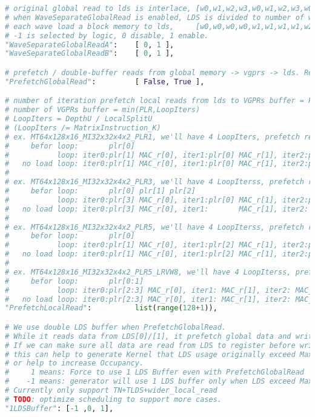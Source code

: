 \documentclass[]{article}
\begin{document}
\begin{lstlisting}[language=python,breaklines=true]
# original global read to lds is interlace, [w0,w1,w2,w3,w0,w1,w2,w3,w0,w1,w2,w3,w0,w1,w2,w3]
# when WaveSeparateGlobalRead is enabled, LDS is divided to number of waves part.
# each wave load a block memory to lds,     [w0,w0,w0,w0,w1,w1,w1,w1,w2,w2,w2,w2,w3,w3,w3,w3]
# -1 is selected by logic, 0 disable, 1 enable.
"WaveSeparateGlobalReadA":    [ 0, 1 ],
"WaveSeparateGlobalReadB":    [ 0, 1 ],

# prefetch / double-buffer reads from global memory -> vgprs -> lds. Requires 2X LDS space, and VGPRs for buffering data on way into LDS
"PrefetchGlobalRead":         [ False, True ],

# number of iteration prefetch local reads from lds to VGPRs buffer = PLR % LoopIter
# number of VGPRs buffer = min(PLR,LoopIters)
# LoopIters = DepthU / LocalSplitU
# (LoopIters /= MatrixInstruction_K)
# ex. MT64x128x16_MI32x32x4x2_PLR1, we'll have 4 LoopIters, prefetch read 1 iteration, with 2 VGPRs buffer
#     befor loop:       plr[0]
#           loop: iter0:plr[1] MAC_r[0], iter1:plr[0] MAC_r[1], iter2:plr[1] MAC_r[0], iter3:plr[0] MAC_r[1]
#   no load loop: iter0:plr[1] MAC_r[0], iter1:plr[0] MAC_r[1], iter2:plr[1] MAC_r[0], iter3:       MAC_r[1]
#
# ex. MT64x128x16_MI32x32x4x2_PLR3, we'll have 4 LoopIterss, prefetch read 3 iteration, with 4 VGPRs buffer
#     befor loop:       plr[0] plr[1] plr[2]
#           loop: iter0:plr[3] MAC_r[0], iter1:plr[0] MAC_r[1], iter2:plr[1] MAC_r[2], iter3:plr[2] MAC_r[3]
#   no load loop: iter0:plr[3] MAC_r[0], iter1:       MAC_r[1], iter2:       MAC_r[2], iter3:       MAC_r[3]
#
# ex. MT64x128x16_MI32x32x4x2_PLR5, we'll have 4 LoopIterss, prefetch read 5%4=1 iteration, with 4 VGPRs buffer
#     befor loop:       plr[0]
#           loop: iter0:plr[1] MAC_r[0], iter1:plr[2] MAC_r[1], iter2:plr[3] MAC_r[2], iter3:plr[0] MAC_r[3]
#   no load loop: iter0:plr[1] MAC_r[0], iter1:plr[2] MAC_r[1], iter2:plr[3] MAC_r[2], iter3:       MAC_r[3]
#
# ex. MT64x128x16_MI32x32x4x2_PLR5_LRVW8, we'll have 4 LoopIterss, prefetch read 5%4=1 iteration, with 4 VGPRs buffer, each read read 2 iterations
#     befor loop:       plr[0:1]
#           loop: iter0:plr[2:3] MAC_r[0], iter1: MAC_r[1], iter2: MAC_r[2], iter3:plr[0:1] MAC_r[3]
#   no load loop: iter0:plr[2:3] MAC_r[0], iter1: MAC_r[1], iter2: MAC_r[2], iter3:         MAC_r[3]
"PrefetchLocalRead":          list(range(128+1)),

# We use double LDS buffer when PrefetchGlobalRead.
# While it reads data from LDS[0]/[1], it prefetch global data and writes to LDS[1]/[0]
# If we can make sure all data are read from LDS to register before writing data to LDS, we can use 1 LDS buffer to save LDS memory.
# this can help to generate Kernel that LDS usage originally exceed MaxLDS if using double LDS buffer,
# or help to increase Occupancy.
#     1 means: Force to use 1 LDS Buffer even with PrefetchGlobalRead
#    -1 means: generator will use 1 LDS buffer only when LDS exceed MaxLDS
# Currently only support TN+TLDS+wider_local_read
# TODO: optimize scheduling to support more cases.
"1LDSBuffer": [-1 ,0, 1],


\end{lstlisting}
\end{document}
